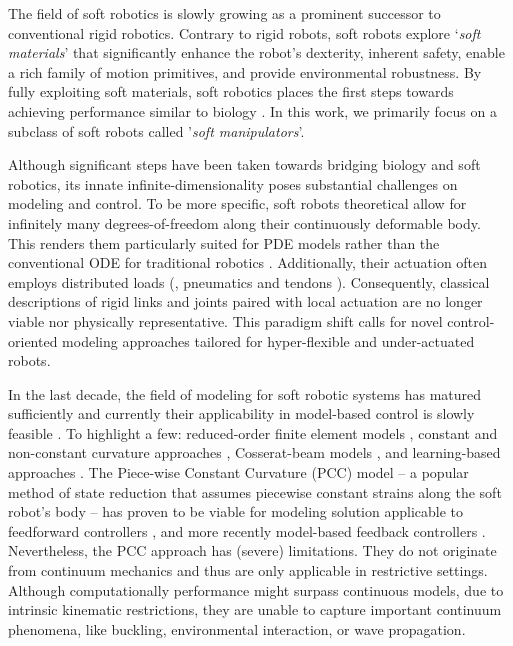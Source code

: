 The field of soft robotics is slowly growing as a prominent successor to conventional rigid robotics. Contrary to rigid robots, soft robots explore `\textit{soft materials}' that significantly enhance the robot's dexterity, inherent safety, enable a rich family of motion primitives, and provide environmental robustness. By fully exploiting soft materials, soft robotics places the first steps towards achieving performance similar to biology \cite{Choi2011,Falkenhahn2015,Marchese2014}. In this work, we primarily focus on a subclass of soft robots called '\textit{soft manipulators}'.

Although significant steps have been taken towards bridging biology and soft robotics, its innate infinite-dimensionality poses substantial challenges on modeling and control. To be more specific, soft robots theoretical allow for infinitely many degrees-of-freedom along their continuously deformable body. This renders them particularly suited for PDE models \cite{Duriez2013,Largilliere2015,Wu2021} rather than the conventional ODE for traditional robotics \cite{Spong2006,Murray1994}. Additionally, their actuation often employs distributed loads (\eg, pneumatics \cite{Falkenhahn2015,Marchese2014} and tendons \cite{Till2019,Wu2021}). Consequently, classical descriptions of rigid links and joints paired with local actuation are no longer viable nor physically representative. This paradigm shift calls for novel control-oriented modeling approaches tailored for hyper-flexible and under-actuated robots.

In the last decade, the field of modeling for soft robotic systems has matured sufficiently and currently their applicability in model-based control is slowly feasible \cite{DellaSantina2021}. To highlight a few: reduced-order finite element models \cite{Duriez2013,Zhang2017,Wu2021}, constant and non-constant curvature approaches \cite{Katzschmann2019,DellaSantina2020}, Cosserat-beam models \cite{Renda2020,Boyer2021}, and learning-based approaches \cite{Bruder2019}. The Piece-wise Constant Curvature (PCC) model -- a popular method of state reduction that assumes piecewise constant strains along the soft robot's body -- has proven to be viable for modeling solution applicable to feedforward controllers \cite{Falkenhahn2015}, and more recently model-based feedback controllers \cite{DellaSantina2020,Katzschmann2019}. Nevertheless, the PCC approach has (severe) limitations. They do not originate from continuum mechanics and thus are only applicable in restrictive settings. Although computationally performance might surpass continuous models, due to intrinsic kinematic restrictions, they are unable to capture important continuum phenomena, like buckling, environmental interaction, or wave propagation.

